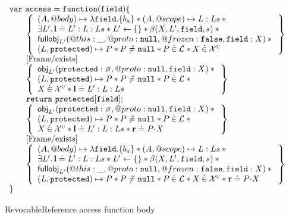\documentclass[a4paper,notitlepage]{report}
\begin{document}
\begin{figure}
\[
  \begin{array}{l}
    \jsvar{access = function(field) \{} \\
    \indblock{
      \logic{
        (A, @body) \mapsto \lambda \js{field}.\{b_a\} \sep
          (A, @scope) \mapsto L:Ls \sep {} \\
        \exists L' \st \ls \doteq L' : L : Ls \sep
          L' \bp \{\} \sep \bpGen(X, L', \js{field}, s) \sep {} \\
        \fullobj_{L'}(@this: \_, @proto: \nil, @frozen: \false, \js{field}: X)
          \sep {} \\
        (L, \js{protected}) \mapsto P \sep P \not\doteq \nil \sep P \dotin \loc
          \sep X \dotin \uvars
      } \\
      \step{Frame/exists} \\
      \logic{
        \obj_{L'}(\js{protected}: \none, @proto: \nil, \js{field}: X) \sep {} \\
        (L, \js{protected}) \mapsto P \sep P \not\doteq \nil \sep P \dotin \loc
          \sep {} \\
        X \dotin \uvars \sep \ls \doteq L':L:Ls
      } \\
      \js{return\ protected[field];} \\
      \logic{
        \obj_{L'}(\js{protected}: \none, @proto: \nil, \js{field}: X) \sep {} \\
        (L, \js{protected}) \mapsto P \sep
        P \not\doteq \nil \sep P \dotin \loc \sep {} \\
        X \dotin \uvars \sep \ls \doteq L':L:Ls \sep \rv \doteq \fld{P}{X}
      } \\
      \step{Frame/exists} \\
      \logic{
        (A, @body) \mapsto \lambda \js{field}.\{b_a\} \sep
          (A, @scope) \mapsto L:Ls \sep {} \\
        \exists L' \st \ls \doteq L' : L : Ls \sep
          L' \bp \{\} \sep \bpGen(X, L', \js{field}, s) \sep {} \\
        \fullobj_{L'}(@this: \_, @proto: \nil, @frozen: \false, \js{field}: X)
          \sep {} \\
        (L, \js{protected}) \mapsto P \sep P \not\doteq \nil \sep P \dotin \loc
          \sep X \dotin \uvars \sep \rv \doteq \fld{P}{X}
      }
    }
    \js{\}}
  \end{array}
\]
\caption{RevocableReference access function body}
\label{rr-access}
\end{figure}
\end{document}
